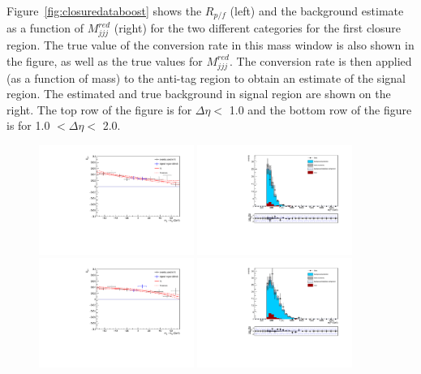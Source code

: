 Figure~\ref{fig:closuredataboost} shows the $R_{p/f}$ (left) and the background estimate as a function of $M_{jjj}^{red}$ (right) for the two different categories for the first closure region. The true value of the conversion rate in this mass window is also shown in the figure, as well as the true values for $M_{jjj}^{red}$. The conversion rate is then applied (as a function of mass) to the anti-tag region to obtain an estimate of the signal region. The estimated and true background in signal region are shown on the right. The top row of the figure is for $\Delta\eta <$ 1.0 and the bottom row of the figure is for 1.0 $< \Delta\eta <$ 2.0. 

\begin{figure}[h]
\centering
\includegraphics[width=0.45\textwidth]{F5/HH4b2p1SR_Fit_BG_boost_dEta0_CR1.pdf}
\includegraphics[width=0.45\textwidth]{F5/HH4b2p1_Plot_BG_boost_dEta0_CR1.pdf}\\
\includegraphics[width=0.45\textwidth]{F5/HH4b2p1SR_Fit_BG_boost_dEta1_CR1.pdf}
\includegraphics[width=0.45\textwidth]{F5/HH4b2p1_Plot_BG_boost_dEta1_CR1.pdf}

\end{figure}
